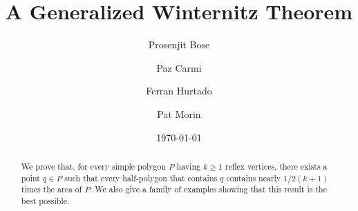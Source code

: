 \documentclass{birkjour}
\begin{document}
\title[A Generalized Winternitz Theorem]{A Generalized Winternitz Theorem}

\author{Prosenjit Bose}
\address{School of Computer Science \\ Carleton University \\ 1125 Colonel By Drive \\ Ottawa CANADA K1S 5B6}

\author{Paz Carmi}
\address{
Department of Computer Science  \\
Ben-Gurion University of the Negev \\
Beer-Sheva 84105, Israel}

\author{Ferran Hurtado}
\address{
Departament de Matem\`atica Aplicada II  \\
Universitat Polit\`ecnica de Catalunya (UPC)   \\
Edifici Omega, Campus Nord  \\
Jordi Girona, 1-3 \\                                           
E-08034 Barcelona  \\  
Spain}

\author{Pat Morin}
\address{School of Computer Science \\ Carleton University \\ 1125 Colonel By Drive \\ Ottawa CANADA K1S 5B6}

\date{\today}

\begin{abstract}
We prove that, for every simple polygon $P$ having $k\ge 1$ reflex
vertices, there exists a point $q\in P$ such that every half-polygon
that contains $q$ contains nearly $1/2(k+1)$ times the area of $P$.
We also give a family of examples showing that this result is the best
possible.
\end{abstract}


\maketitle
\end{document}
